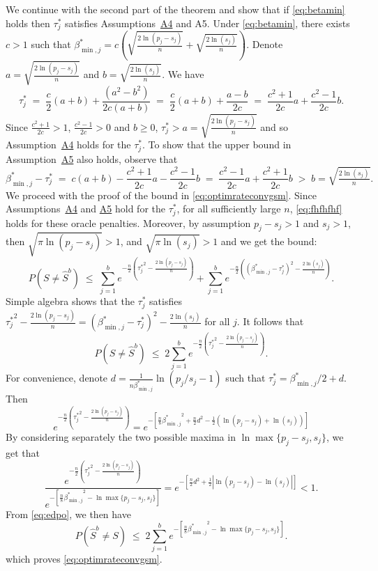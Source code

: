 \documentclass[bj,authoryear]{imsart}
\theoremstyle{plain}
\begin{document}
We continue with the second part of the theorem and show that if \eqref{eq:betamin} holds then $\tau^*_j$ satisfies Assumptions~\hyperlink{lab:A4}{A4} and A5. Under \eqref{eq:betamin}, there exists $c>1$ such that $\beta^*_{\min,j}=c(\sqrt{\tfrac{2\ln(p_j-s_j)}{n}} + \sqrt{\tfrac{2\ln(s_j)}{n}})$. Denote $a=\sqrt{\tfrac{2\ln(p_j-s_j)}{n}}$ and $b=\sqrt{\tfrac{2\ln(s_j)}{n}}$. We have
$$
\tau_j^*\;=\;\frac{c}{2} (a+b)+\frac{(a^2-b^2)}{2c(a+b)}\;=\;\frac{c}{2} (a+b)+\frac{a-b}{2c}\;=\;\frac{c^2+1}{2c}a+\frac{c^2-1}{2c}b.
$$
Since $\tfrac{c^2+1}{2c}> 1$, $\tfrac{c^2-1}{2c}> 0$ and $b \geq 0$, $\tau^*_j>a=\sqrt{\tfrac{2\ln(p_j-s_j)}{n}}$ and so Assumption~\hyperlink{lab:A4}{A4} holds for the $\tau^*_j$. To show that the upper bound in Assumption~\hyperlink{lab:A5}{A5} also holds, observe that
$$
\beta_{\min,j}^* - \tau^*_j \;=\; c(a+b)- \frac{c^2+1}{2c}a-\frac{c^2-1}{2c}b \;= \; \frac{c^2-1}{2c}a+\frac{c^2+1}{2c}b\;>\;  b=\sqrt{\tfrac{2\ln(s_j)}{n}}.
$$
We proceed with the proof of the bound in \eqref{eq:optimrateconvgsm}. Since Assumptions~\hyperlink{lab:A4}{A4} and \hyperlink{lab:A5}{A5} hold for the $\tau^*_j$, for all sufficiently large $n$, \eqref{eq:fhfhfhf} holds for these oracle penalties. Moreover, by assumption $p_j-s_j>1$ and $s_j>1$, then $\sqrt{\pi\ln(p_j-s_j)}>1$, and $\sqrt{\pi\ln(s_j)}>1$ and we get the bound:
$$P(S\neq \hat{S}^b) \; \leq\;\sum_{j=1}^be^{-\tfrac{n}{2}\left({\tau^*_j}^2-\tfrac{2\ln(p_j-s_j)}{n}\right)}+\sum_{j=1}^be^{-\tfrac{n}{2}\left((\beta^*_{\min,j}-\tau^*_j)^2-\tfrac{2\ln(s_j)}{n}\right)}.$$
Simple algebra shows that the $\tau_j^*$ satisfies ${\tau_j^*}^2-\tfrac{2\ln(p_j-s_j)}{n}=(\beta^*_{\min,j}-{\tau_j^*})^2-\tfrac{2\ln(s_j)}{n}$ for all $j$. It follows that
\begin{equation}\label{eq:edpo}
P(S\neq \hat{S}^b) \; \leq\;2\sum_{j=1}^be^{-\tfrac{n}{2}\left({\tau^*_j}^2-\tfrac{2\ln(p_j-s_j)}{n}\right)}.
\end{equation}
For convenience, denote $d = \frac{1}{n \beta_{\min,j}^*} \ln (p_j / s_j-1)$ such that $\tau^*_j= \beta_{\min,j}^*/2 + d$. Then
$$e^{-\frac{n}{2}\left({\tau^*_j}^2-\frac{2\ln(p_j-s_j)}{n}\right)}
=e^{-\left[\frac{n}{8}{\beta_{\min,j}^*}^2+\frac{n}{2}d^2 - \frac{1}{2}\left(\ln (p_j- s_j)+\ln (s_j)\right) \right]}$$
By considering separately the two possible maxima in $\ln \max\{p_j-s_j,s_j\}$, we get that
$$\frac{e^{-\frac{n}{2}\left({\tau^*_j}^2-\frac{2\ln(p_j-s_j)}{n}\right)}}{e^{-[\frac{n}{8}{\beta_{\min,j}^*}^2-\ln \max\{p_j-s_j,s_j\}]}}= 
e^{-\left[\frac{n}{2}d^2 + \frac{1}{2}\left|\ln (p_j- s_j)-\ln (s_j)\right|\right]} <1.$$
From \eqref{eq:edpo}, we then have
$$P(\hat{S}^{b} \neq S) \; \leq \; 2 \sum_{j=1}^be^{-[\frac{n}{8}{\beta^*_{\min,j}}^2-\ln \max\{p_j-s_j,s_j\}]}.$$
which proves \eqref{eq:optimrateconvgsm}.
\end{document}
